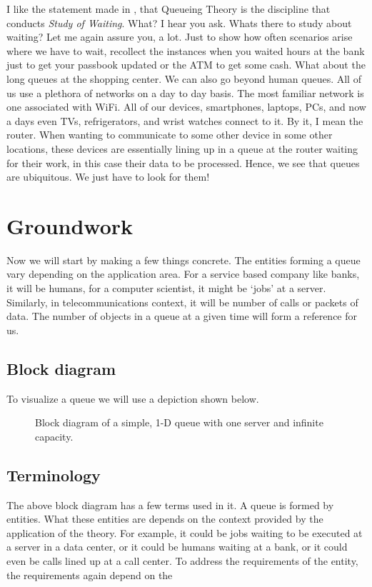 \documentclass[11pt, a4paper]{report}
\begin{document}
I like the statement made in \cite{RobertazziQ}, that Queueing Theory is the discipline that conducts \emph{Study of Waiting}. What? I hear you ask. Whats there to study about waiting? Let me again assure you, a lot. Just to show how often scenarios arise where we have to wait, recollect the instances when you waited hours at the bank just to get your passbook updated or the ATM to get some cash. What about the long queues at the shopping center. We can also go beyond human queues. All of us use a plethora of networks on a day to day basis. The most familiar network is one associated with WiFi. All of our devices, smartphones, laptops, PCs, and now a days even TVs, refrigerators, and wrist watches connect to it. By it, I mean the router. When wanting to communicate to some other device in some other locations, these devices are essentially lining up in a queue at the router waiting for their work, in this case their data to be processed. Hence, we see that queues are ubiquitous. We just have to look for them!  

\section{Groundwork}
Now we will start by making a few things concrete. The entities forming a queue vary depending on the application area. For a service based company like banks, it will be humans, for a computer scientist, it might be   `jobs' at a server. Similarly, in telecommunications context, it will be number of calls or packets of data. The number of objects in a queue at a given time will form a reference for us. 

\subsection{Block diagram}
To visualize a queue we will use a depiction shown below.
    \begin{figure}
        \centering
        
        \label{fig:simpleQblk}
        \caption{Block diagram of a simple, 1-D queue with one server and infinite capacity.}
    \end{figure}

\subsection{Terminology}
The above block diagram has a few terms used in it. A queue is formed by entities. What these entities are depends on the context provided by the application of the theory. For example, it could be jobs waiting to be executed at a server in a data center, or it could be humans waiting at a bank, or it could even be calls lined up at a call center. To address the requirements of the entity, the requirements again depend on the 
\end{document}
